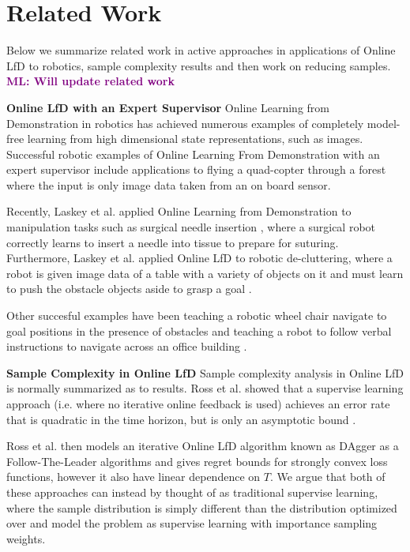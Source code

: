 \documentclass[10pt, conference]{ieeeconf}      %
\newcommand{\mlnote}[1]{\ifthenelse{ \boolean{include-notes}}%
 {\textcolor{purple}{\textbf{ML: #1}}}{}}
\begin{document}
\section{Related Work}
Below we summarize related work in active approaches in applications of Online LfD to robotics, sample complexity results and then work on reducing samples. \mlnote{Will update related work}


\noindent \textbf{Online LfD with an Expert Supervisor}
Online Learning from Demonstration in robotics has achieved numerous examples of completely model-free learning from high dimensional state representations, such as images. Successful robotic examples of Online Learning From Demonstration with an expert supervisor include applications to flying a quad-copter through a forest where the input is only image data taken from an on board sensor. 

Recently, Laskey et al. applied Online Learning from Demonstration to manipulation tasks such as surgical needle insertion \cite{laskeyshiv}, where a surgical robot correctly learns to insert a needle into tissue to prepare for suturing. Furthermore, Laskey et al. applied Online LfD to robotic de-cluttering, where a robot is given image data of a table with a variety of objects on it and must learn to push the obstacle objects aside to grasp a goal \cite{laskeyrobot}. 

Other succesful examples have been teaching a robotic wheel chair navigate to goal positions in the presence of obstacles and teaching a robot to follow verbal instructions to navigate across an office building \cite{kim2013maximum, duvallet2013imitation}. 

\noindent \textbf{Sample Complexity in Online LfD}
Sample complexity analysis in Online LfD is normally summarized as to results.  Ross et al. showed that a supervise learning approach (i.e. where no iterative online feedback is used) achieves an error rate that is quadratic in the time horizon, but is only an asymptotic bound \cite{ross2010efficient}. 

Ross et al. then models an iterative Online LfD algorithm known as DAgger as a Follow-The-Leader algorithms and gives regret bounds for strongly convex loss functions, however it also have linear dependence on $T$. We argue that both of these approaches can instead by thought of as traditional supervise learning, where the sample distribution is simply different than the distribution optimized over and model the problem as supervise learning with importance sampling weights. 
\end{document}
